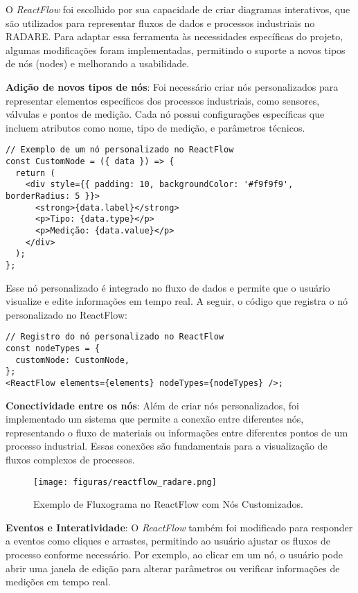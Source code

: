 O \textit{ReactFlow} foi escolhido por sua capacidade de criar diagramas interativos, que são utilizados para representar fluxos de dados e processos industriais no RADARE. Para adaptar essa ferramenta às necessidades específicas do projeto, algumas modificações foram implementadas, permitindo o suporte a novos tipos de nós (nodes) e melhorando a usabilidade.

\textbf{Adição de novos tipos de nós}: Foi necessário criar nós personalizados para representar elementos específicos dos processos industriais, como sensores, válvulas e pontos de medição. Cada nó possui configurações específicas que incluem atributos como nome, tipo de medição, e parâmetros técnicos.

\begin{verbatim}
// Exemplo de um nó personalizado no ReactFlow
const CustomNode = ({ data }) => {
  return (
    <div style={{ padding: 10, backgroundColor: '#f9f9f9', borderRadius: 5 }}>
      <strong>{data.label}</strong>
      <p>Tipo: {data.type}</p>
      <p>Medição: {data.value}</p>
    </div>
  );
};
\end{verbatim}

Esse nó personalizado é integrado no fluxo de dados e permite que o usuário visualize e edite informações em tempo real. A seguir, o código que registra o nó personalizado no ReactFlow:

\begin{verbatim}
// Registro do nó personalizado no ReactFlow
const nodeTypes = {
  customNode: CustomNode,
};
<ReactFlow elements={elements} nodeTypes={nodeTypes} />;
\end{verbatim}

\textbf{Conectividade entre os nós}: Além de criar nós personalizados, foi implementado um sistema que permite a conexão entre diferentes nós, representando o fluxo de materiais ou informações entre diferentes pontos de um processo industrial. Essas conexões são fundamentais para a visualização de fluxos complexos de processos.

\begin{figure}[htbp]
    \centering
    \texttt{[image: figuras/reactflow\_radare.png]}
    \caption{Exemplo de Fluxograma no ReactFlow com Nós Customizados.}
    \label{Fig:ReactFlow}
\end{figure}

\textbf{Eventos e Interatividade}: O \textit{ReactFlow} também foi modificado para responder a eventos como cliques e arrastes, permitindo ao usuário ajustar os fluxos de processo conforme necessário. Por exemplo, ao clicar em um nó, o usuário pode abrir uma janela de edição para alterar parâmetros ou verificar informações de medições em tempo real.

